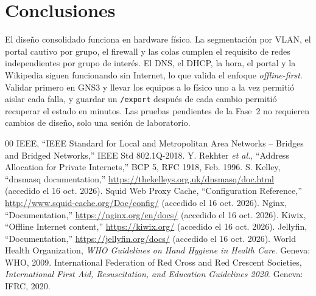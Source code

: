 \documentclass[conference]{IEEEtran}
\begin{document}
\section{Conclusiones}
El diseño consolidado funciona en hardware físico. La segmentación por VLAN, el portal cautivo por grupo, el firewall y las colas cumplen el requisito de redes independientes por grupo de interés. El DNS, el DHCP, la hora, el portal y la Wikipedia siguen funcionando sin Internet, lo que valida el enfoque \textit{offline-first}. Validar primero en GNS3 y llevar los equipos a lo físico uno a la vez permitió aislar cada falla, y guardar un \texttt{/export} después de cada cambio permitió recuperar el estado en minutos. Las pruebas pendientes de la Fase~2 no requieren cambios de diseño, solo una sesión de laboratorio.

\begin{thebibliography}{00}
 IEEE, ``IEEE Standard for Local and Metropolitan Area Networks -- Bridges and Bridged Networks,'' IEEE Std 802.1Q-2018.
 Y. Rekhter \textit{et al.}, ``Address Allocation for Private Internets,'' BCP 5, RFC 1918, Feb. 1996.
 S. Kelley, ``dnsmasq documentation,'' \url{https://thekelleys.org.uk/dnsmasq/doc.html} (accedido el 16 oct. 2026).
 Squid Web Proxy Cache, ``Configuration Reference,'' \url{http://www.squid-cache.org/Doc/config/} (accedido el 16 oct. 2026).
 Nginx, ``Documentation,'' \url{https://nginx.org/en/docs/} (accedido el 16 oct. 2026).
 Kiwix, ``Offline Internet content,'' \url{https://kiwix.org/} (accedido el 16 oct. 2026).
 Jellyfin, ``Documentation,'' \url{https://jellyfin.org/docs/} (accedido el 16 oct. 2026).
 World Health Organization, \textit{WHO Guidelines on Hand Hygiene in Health Care}. Geneva: WHO, 2009.
 International Federation of Red Cross and Red Crescent Societies, \textit{International First Aid, Resuscitation, and Education Guidelines 2020}. Geneva: IFRC, 2020.
\end{thebibliography}
\end{document}
